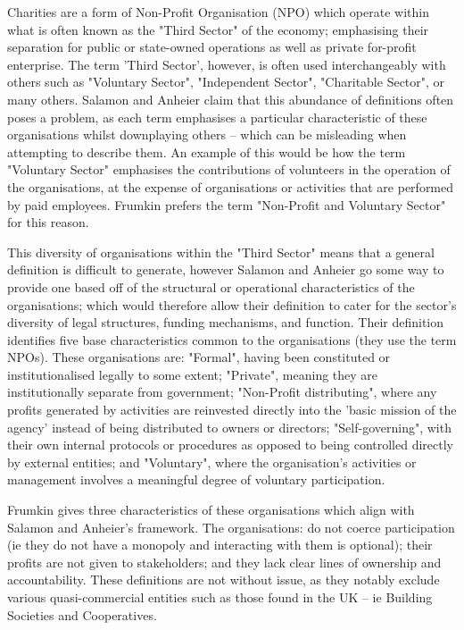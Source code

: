 Charities are a form of Non-Profit Organisation (NPO) which operate within what is often known as the "Third Sector" of the economy; emphasising their separation for public or state-owned operations as well as private for-profit enterprise. The term 'Third Sector', however, is often used interchangeably with others such as "Voluntary Sector", "Independent Sector", "Charitable Sector", or many others. Salamon and Anheier claim that this abundance of definitions often poses a problem, as each term emphasises a particular characteristic of these organisations whilst downplaying others -- which can be misleading when attempting to describe them. An example of this would be how the term "Voluntary Sector" emphasises the contributions of volunteers in the operation of the organisations, at the expense of organisations or activities that are performed by paid employees. Frumkin prefers the term "Non-Profit and Voluntary Sector" for this reason.

This diversity of organisations within the "Third Sector" means that a general definition is difficult to generate, however Salamon and Anheier go some way to provide one based off of the structural or operational characteristics of the organisations; which would therefore allow their definition to cater for the sector's diversity of legal structures, funding mechanisms, and function. Their definition identifies five base characteristics common to the organisations (they use the term NPOs). These organisations are: "Formal", having been constituted or institutionalised legally to some extent; "Private", meaning they are institutionally separate from government; "Non-Profit distributing", where any profits generated by activities are reinvested directly into the 'basic mission of the agency' instead of being distributed to owners or directors; "Self-governing", with their own internal protocols or procedures as opposed to being controlled directly by external entities; and "Voluntary", where the organisation's activities or management involves a meaningful degree of voluntary participation.

Frumkin gives three characteristics of these organisations which align with Salamon and Anheier's framework. The organisations: do not coerce participation (ie they do not have a monopoly and interacting with them is optional); their profits are not given to stakeholders; and they lack clear lines of ownership and accountability. These definitions are not without issue, as they notably exclude various quasi-commercial entities such as those found in the UK -- ie Building Societies and Cooperatives.

